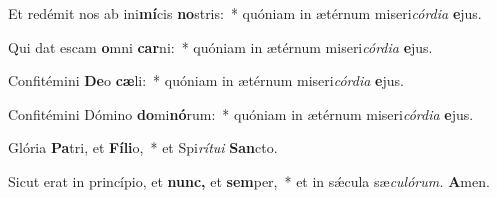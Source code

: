 \item Et redémit nos ab ini\textbf{mí}cis \textbf{no}stris:~* quóniam in ætérnum miseri\hspace{0.03em}\textit{córdia} \textbf{e}jus.
\item Qui dat escam \textbf{o}mni \textbf{car}ni:~* quóniam in ætérnum miseri\hspace{0.03em}\textit{córdia} \textbf{e}jus.
\item Confitémini \textbf{De}o \textbf{cæ}li:~* quóniam in ætérnum miseri\hspace{0.03em}\textit{córdia} \textbf{e}jus.
\item Confitémini Dómino \textbf{do}mi\textbf{nó}rum:~* quóniam in ætérnum miseri\hspace{0.03em}\textit{córdia} \textbf{e}jus.
\item Glória \textbf{Pa}tri, et \textbf{Fí}\textbf{li}o,~* et Spi\hspace{0.03em}\textit{rítui} \textbf{San}cto.
\item Sicut erat in princípio, et \textbf{nunc,} et \textbf{sem}per,~* et in sǽcula sæ\hspace{0.03em}\textit{culórum.} \textbf{A}men.